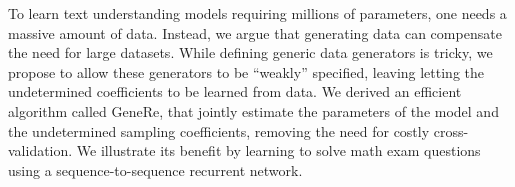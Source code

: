 To learn text understanding models requiring millions of parameters, one needs a massive amount of data. Instead, we argue that generating data can compensate the need for large datasets. While defining generic data generators is tricky, we propose to allow these generators to be ``weakly'' specified, leaving letting the undetermined coefficients to be learned from data.  We derived an efficient algorithm called GeneRe, that jointly estimate the parameters of the model and the undetermined sampling coefficients, removing the need for costly cross-validation. We illustrate its benefit by learning to solve math exam questions using a sequence-to-sequence recurrent network.
